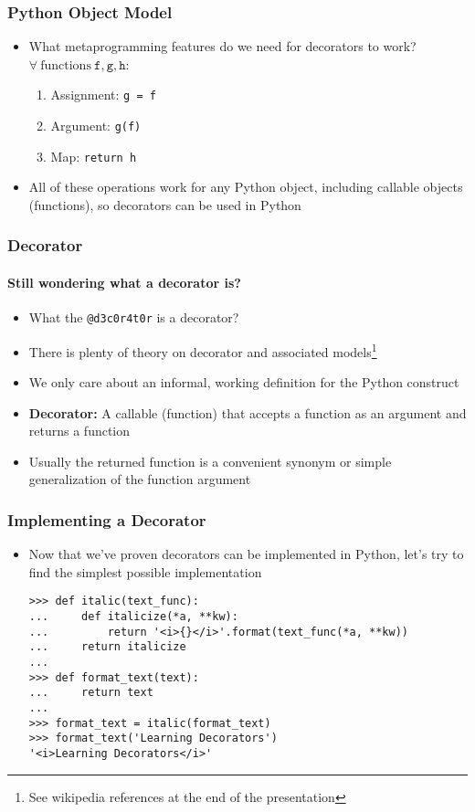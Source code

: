 \documentclass{beamer}
\begin{document}
\begin{frame}[fragile]
\frametitle{Python Object Model}
\begin{itemize}
  \item<1->{What metaprogramming features do we need for decorators to work?  $\forall\ \text{functions}\ \mathtt{f}, \mathtt{g}, \mathtt{h}$:}
    \begin{enumerate}
      \item<2->{Assignment: \texttt{g = f}}
      \item<3->{Argument: \texttt{g(f)}}
      \item<4->{Map: \texttt{return h}}
    \end{enumerate}
  \item<5->{All of these operations work for any Python object, including callable objects (functions), so decorators can be used in Python}
\end{itemize}
\end{frame}

\begin{frame}[fragile]
\frametitle{Decorator}
\framesubtitle{Still wondering what a decorator is?}
\begin{itemize}
  \item<2->{What the \texttt{@d3c0r4t0r} is a decorator?}
  \item<3->{There is plenty of theory on decorator and associated models\footnote{See wikipedia references at the end of the presentation}}
  \item<4->{We only care about an informal, working definition for the Python construct}
  \item<5->{{\bf Decorator:} A callable (function) that accepts a function as an argument and returns a function}
  \item<6->{Usually the returned function is a convenient synonym or simple generalization of the function argument}
\end{itemize}
\end{frame}

\begin{frame}[fragile]
\frametitle{Implementing a Decorator}
\begin{itemize}
  \item<1->{Now that we've proven decorators can be implemented in Python, let's try to find the simplest possible implementation}
    \begin{small}
    \begin{verbatim}
>>> def italic(text_func):
...     def italicize(*a, **kw):
...         return '<i>{}</i>'.format(text_func(*a, **kw))
...     return italicize
...
>>> def format_text(text):
...     return text
...
>>> format_text = italic(format_text)
>>> format_text('Learning Decorators')
'<i>Learning Decorators</i>'
    \end{verbatim}
    \end{small}
\end{itemize}
\end{frame}
\end{document}
